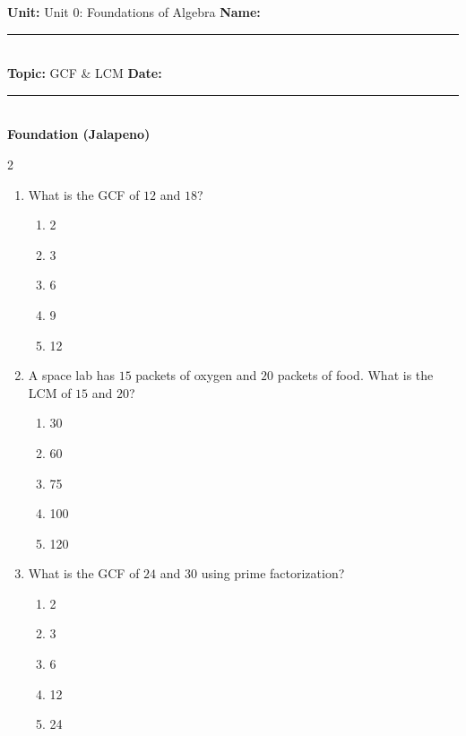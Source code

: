 \documentclass[10pt]{article}
\begin{document}
\enlargethispage{2.5cm}

\begin{tcolorbox}[colback=mainblue!5, colframe=mainblue, sharp corners, boxrule=0.5pt]
    \small \textbf{Unit:} Unit 0: Foundations of Algebra \hfill \textbf{Name:} \rule{3cm}{0.4pt} \\
    \small \textbf{Topic:} GCF & LCM \hfill \textbf{Date:} \rule{2cm}{0.4pt} \\
    \centering \textbf{\large Foundation (Jalapeno)}
\end{tcolorbox}

\vspace{0.2cm}

\begin{multicols}{2}
\begin{enumerate}[label=\textbf{Q\arabic*.}, leftmargin=*, itemsep=6pt, parsep=0pt]

  \item \small What is the GCF of $12$ and $18$?
  \begin{enumerate}[label=(\Alph*), leftmargin=0.6cm, nosep, itemsep=2pt]
    \item 2
    \item 3
    \item 6
    \item 9
    \item 12
  \end{enumerate}

  \item \small A space lab has $15$ packets of oxygen and $20$ packets of food. What is the LCM of $15$ and $20$?
  \begin{enumerate}[label=(\Alph*), leftmargin=0.6cm, nosep, itemsep=2pt]
    \item 30
    \item 60
    \item 75
    \item 100
    \item 120
  \end{enumerate}

  \item \small What is the GCF of $24$ and $30$ using prime factorization?
  \begin{enumerate}[label=(\Alph*), leftmargin=0.6cm, nosep, itemsep=2pt]
    \item 2
    \item 3
    \item 6
    \item 12
    \item 24
  \end{enumerate}


\end{enumerate}
\end{multicols}
\end{document}
